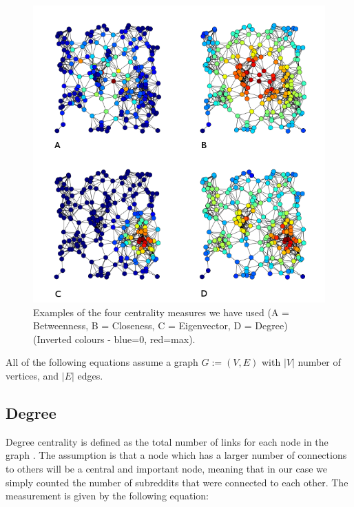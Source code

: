 \documentclass[bsc,frontabs,twoside,singlespacing,parskip,deptreport]{infthesis}
\begin{document}
\begin{center}
	\begin{figure}[!htb]\label{graph}
		\centering
 		\includegraphics[width=\textwidth]{centrality_measures.png}
  		\caption{Examples of the four centrality measures we have used (A = Betweenness, B = Closeness, C = Eigenvector, D = Degree) (Inverted colours - blue=0, red=max). \cite{fig:centrality-examples}}
  		\label{fig:centrality}
	\end{figure}	
\end{center}

All of the following equations assume a graph $G := ( V , E )$ with $|V|$ number of vertices, and $|E|$ edges.

\subsection{Degree}

Degree centrality is defined as the total number of links for each node in the graph \cite{erdos}. The assumption is that a node which has a larger number of connections to others will be a central and important node, meaning that in our case we simply counted the number of subreddits that were connected to each other. The measurement is given by the following equation:
\end{document}
